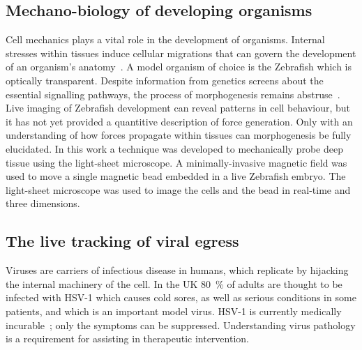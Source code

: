 \subsection{Mechano-biology of developing organisms}\label{sec:motivation/tweezers}

Cell mechanics plays a vital role in the development of organisms.
Internal stresses within tissues induce cellular migrations that can govern the development of an organism's anatomy~\cite{gilbertDevelopmentalBiology2000}.
A model organism of choice is the Zebrafish which is optically transparent.
Despite information from genetics screens about the essential signalling pathways, the process of morphogenesis remains abstruse~\cite{mammotoMechanicalControlTissue2010,mammotoMechanobiologyDevelopmentalControl2013}.
Live imaging of Zebrafish development can reveal patterns in cell behaviour, but it has not yet provided a quantitive description of force generation.
Only with an understanding of how forces propagate within tissues can morphogenesis be fully elucidated.
%
In this work a technique was developed to mechanically probe deep tissue using the light-sheet microscope.
A minimally-invasive magnetic field was used to move a single magnetic bead embedded in a live Zebrafish embryo.
The light-sheet microscope was used to image the cells and the bead in real-time and three dimensions.

\subsection{The live tracking of viral egress}\label{sec:motivation/spt}

Viruses are carriers of infectious disease in humans, which replicate by hijacking the internal %
machinery of the cell.
In the UK \SI{80}{\percent} of adults are thought to be infected with \gls{HSV}-1 which causes cold sores, as well as serious conditions in some patients, and which is an important model virus.
\gls{HSV}-1 is currently medically incurable~\cite{_herpes_????}; only the symptoms can be suppressed.
Understanding virus pathology is a requirement for assisting in therapeutic intervention.

